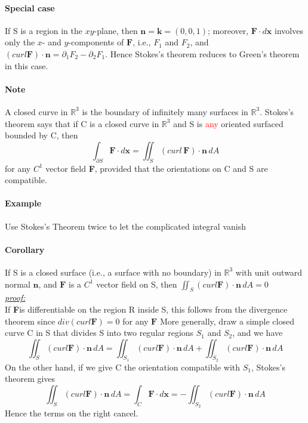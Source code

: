 \documentclass[11pt]{article}
\newcommand{\tb}[1]{\textbf{#1}}
\newcommand{\real}[0]{\mathbb{R}}
\newcommand{\proof}[0]{\textit{\underline{proof:} }}
\newcommand{\vx}[0]{\tb{x}}
\newcommand{\vf}[0]{\tb{F}}
\newcommand{\vn}[0]{\tb{n}}
\begin{document}
\paragraph{Special case} If S is a region in the $xy$-plane, then $\tb{n} = \tb{k} = (0,0,1)$; moreover, $\vf \cdot d\vx$ involves only the $x$- and $y$-components of $\vf$, i.e., $F_1$ and $F_2$, and $(curl \vf) \cdot \tb{n} = \partial_1 F_2 - \partial_2 F_1$. Hence Stokes's theorem reduces to Green's theorem in this case.
\paragraph{Note} A closed curve in $\real^3$ is the boundary of infinitely many surfaces in $\real^3$. Stokes's theorem says that if C is a closed curve in $\real^3$ and S is \textcolor{red}{any} oriented surfaced bounded by C, then 
$$\int_{\partial S} \tb{F}\cdot d\vx = \iint_S (curl \, \vf)\cdot \tb{n} \,dA$$
for any $C^1$ vector field \tb{F}, provided that the orientations on C and S are compatible.

\paragraph{Example}
Use Stokes's Theorem twice to let the complicated integral vanish

\paragraph{Corollary} If S is a closed surface (i.e., a surface with no boundary) in $\real^3$ with unit outward normal $\tb{n}$, and $\vf$ is a $C^1$ vector field on S, then $\iint_S(curl \tb{F}) \cdot \tb{n} \, dA = 0$ \\
\proof \\ 
If \vf is differentiable on the region R inside S, this follows from the divergence theorem since $div(curl \vf) = 0$ for any $\vf$
More generally, draw a simple closed curve C in S that divides S into two regular regions $S_1$ and $S_2$, and we have
$$\iint_S (curl \vf)\cdot \vn \,dA = \iint_{S_1}(curl\vf)\cdot\vn\,dA+\iint_{S_2}(curl\vf)\cdot \vn \, dA $$
On the other hand, if we give C the orientation compatible with $S_1$, Stokes's theorem gives
$$\iint_S (curl \vf)\cdot \vn \,dA = \int_C \vf \cdot d\vx = - \iint_{S_2}(curl \vf)\cdot \vn \,dA$$
Hence the terms on the right cancel.
\end{document}

